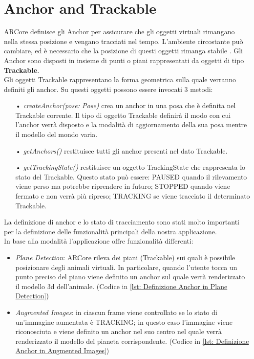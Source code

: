 \documentclass[crop=false, class=book]{standalone}
\begin{document}
		
	\chapter{Anchor and Trackable}
	
		ARCore definisce gli Anchor per assicurare che gli oggetti virtuali rimangano nella stessa posizione e vengano 					tracciati nel tempo. L'ambiente circostante può cambiare, ed è necessario che la posizione di questi oggetti
		rimanga stabile \cite{gumgumcu2019arcore}. Gli Anchor sono disposti in insieme di punti o piani rappresentati da 				oggetti di tipo \textbf{Trackable}.\\
		Gli oggetti Trackable rappresentano la forma geometrica sulla quale verranno definiti gli anchor.
		Su questi oggetti possono essere invocati 3 metodi:
		\begin{itemize}
			\item[•] \emph{createAnchor(pose: Pose)} crea un anchor in una posa che è definita nel Trackable corrente. Il tipo di oggetto Trackable definirà il modo con cui l'anchor verrà disposto e la modalità di aggiornamento della sua posa mentre il modello del mondo varia.
			\item[•] \emph{ getAnchors()} restituisce tutti gli anchor presenti nel dato Trackable.
			\item[•] \emph{getTrackingState()} restituisce un oggetto TrackingState che rappresenta lo stato del Trackable. Questo stato può essere: PAUSED quando il rilevamento viene perso ma potrebbe riprendere in futuro; STOPPED quando viene fermato e non verrà più ripreso; TRACKING se viene tracciato il determinato Trackable.
		\end{itemize}
		\begin{flushleft}
			La definizione di anchor e lo stato di tracciamento sono stati molto importanti per la definizione delle 						funzionalità principali della nostra applicazione.\\
	 		In base alla modalità l'applicazione offre funzionalità differenti:
		\end{flushleft}
	 	\begin{itemize}
	 		\item \emph{Plane Detection}: ARCore rileva dei piani (Trackable) sui quali è possibile posizionare degli animali virtuali. In particolare, quando l'utente tocca un punto preciso del piano viene definito un anchor sul quale verrà renderizzato il modello 3d dell'animale. (Codice in \vref{lst: Definizione Anchor in Plane Detection})
	 	
	 		\item \emph{Augmented Images}: in ciascun frame viene controllato se lo stato di un'immagine aumentata è TRACKING; in questo caso l'immagine viene riconosciuta e viene definito un anchor nel suo centro nel quale verrà renderizzato il modello del pianeta corrispondente. (Codice in \vref{lst: Definizione Anchor in Augmented Images})
	 	\end{itemize}
		
\end{document}
